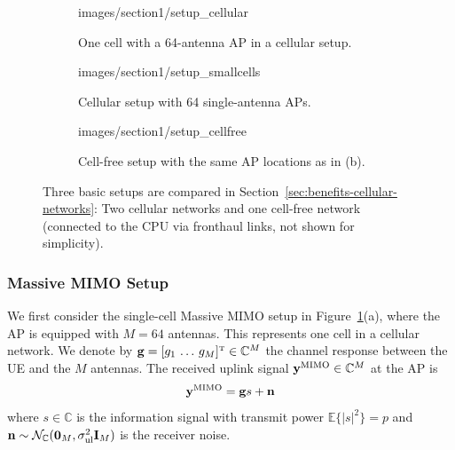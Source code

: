 \begin{figure}[t!]
	\centering  \vspace{-4mm}
        \begin{subfigure}[b]{\columnwidth} \centering
	\begin{overpic}[width=.4\columnwidth,tics=10]{images/section1/setup_cellular}
\end{overpic} 
                \caption{One cell with a 64-antenna \gls{AP} in a cellular setup.}    \vspace{+2mm}
        \end{subfigure} 
        \begin{subfigure}[b]{\columnwidth} \centering 
	\begin{overpic}[width=.4\columnwidth,tics=10]{images/section1/setup_smallcells}
\end{overpic} 
                \caption{Cellular setup with 64 single-antenna \glspl{AP}.} 
        \end{subfigure}
        \begin{subfigure}[b]{\columnwidth} \centering 
	\begin{overpic}[width=.4\columnwidth,tics=10]{images/section1/setup_cellfree}
\end{overpic} 
                \caption{Cell-free setup with the same \gls{AP} locations as in (b).} 
        \end{subfigure} 
	\caption{Three basic setups are compared in Section~\ref{sec:benefits-cellular-networks}: Two cellular networks and one cell-free network (connected to the CPU via fronthaul links, not shown for simplicity).} 
	\label{fig:basic-comparison-cellular-cellfree} 
\end{figure}




\subsubsection{Massive \gls{MIMO} Setup}

We first consider the single-cell Massive \gls{MIMO} setup in Figure~\ref{fig:basic-comparison-cellular-cellfree}(a), where the \gls{AP} is equipped with $M=64$ antennas. This represents one cell in a cellular network.
We denote by $\vect{g} = [g_1 \, \ldots \, g_M]^{\Ttran} \in \mathbb{C}^M$ the channel response between the \gls{UE} and the $M$ antennas.
The received uplink signal $\mathbf{y}^{\textrm{MIMO}} \in \mathbb{C}^M$ at the \gls{AP} is
\begin{equation} \label{eq:basic-uplink}
\mathbf{y}^{\textrm{MIMO}} = \mathbf{g} s + \mathbf{n}
\end{equation}
where $s \in \mathbb{C}$ is the information signal with transmit power $\mathbb{E}\{ | s|^2 \} = p$ and $\mathbf{n} \sim \mathcal{N}_{\mathbb{C}} ( \mathbf{0}_M, \sigma^2_{\mathrm{ul}} \mathbf{I}_M )$ is the receiver noise.

